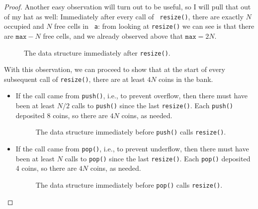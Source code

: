\documentclass{tstextbook}
\begin{document}
\begin{proof}
Another easy observation will turn out to be useful, so I will pull
that out of my hat as well:
 Immediately after every call of {\tt
  resize()}, there are exactly $N$ occupied and $N$ free cells in {\tt
  a}: from looking at {\tt resize()} we can see is that there are
$\mathtt{max}-N$ free cells, and we already observed above that
$\mathtt{max}=2N$.
\begin{figure}
  \caption{The data structure immediately after {\tt resize()}.}
\end{figure}



With this observation, we can proceed to show that at the start of
every subsequent call of {\tt resize()}, there are at least $4N$ coins
in the bank.
\begin{itemize}
\item If the call came from \texttt{push()}, i.e., to prevent
  overflow, then there must have been at least $N/2$ calls to
  \texttt{push()} since the last \texttt{resize()}. Each
  \texttt{push()} deposited 8 coins, so there are $4N$ coins, as
  needed.
\begin{figure}
  \caption{The data structure immediately before \texttt{push()} calls
    \texttt{resize()}.}
\end{figure}
\item If the call came from \texttt{pop()}, i.e., to prevent underflow,
  then there must have been at least $N$ calls to \texttt{pop()} since
  the last \texttt{resize()}. Each \texttt{pop()} deposited 4 coins,
  so there are $4N$ coins, as needed.
\begin{figure}
  \caption{The data structure immediately before \texttt{pop()} calls {\tt resize()}.}
\end{figure}
\end{itemize}
\end{proof}
\end{document}
